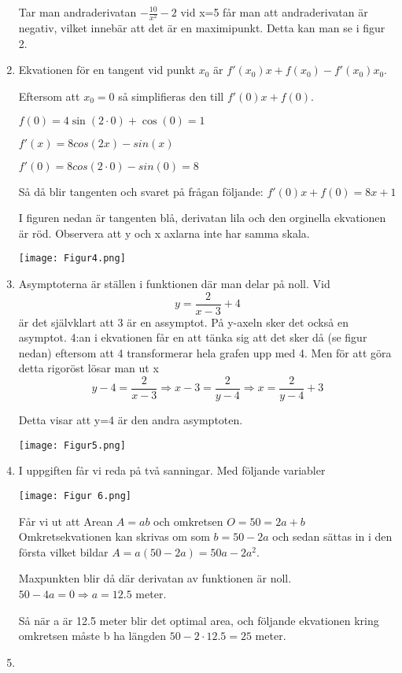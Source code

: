 \documentclass[a4paper,12pt]{article}
\begin{document}
\begin{enumerate}
    Tar man andraderivatan $-\frac{10}{x^2}-2$ vid x=5 får man att 
    andraderivatan är negativ, vilket innebär att det är en maximipunkt.   
    Detta kan man se i figur 2. 

    \item 
    Ekvationen för en tangent vid punkt $x_0$ är
    $f'(x_0)x+f(x_0)-f'(x_0)x_0$.
    
    Eftersom att $x_0=0$ så simplifieras den till
    $f'(0)x+f(0)$.

    $f(0)=4\sin(2\cdot 0)+\cos(0)=1$

    $f'(x)=8cos(2x)-sin(x)$
    
    $f'(0)=8cos(2\cdot 0)-sin(0)=8$

    Så då blir tangenten och svaret på frågan följande:
    $f'(0)x+f(0)=8x+1$

    I figuren nedan är tangenten blå, derivatan lila 
    och den orginella ekvationen är röd. Observera att 
    y och x axlarna inte har samma skala.

    \begin{center}    
        \texttt{[image: Figur4.png]}
    \end{center}

    \item Asymptoterna är ställen i funktionen där man delar på noll.
    Vid $$y=\frac{2}{x-3}+4$$ är det självklart att 3 är en assymptot.
    På y-axeln sker det också en asymptot. 4:an i ekvationen
    får en att tänka sig att det sker då (se figur nedan) eftersom
    att 4 transformerar hela grafen upp med 4. Men för att göra detta 
    rigoröst lösar man ut x
    $$y-4=\frac{2}{x-3}\Rightarrow x-3=\frac{2}{y-4}\Rightarrow x=\frac{2}{y-4}+3 $$

    Detta visar att y=4 är den andra asymptoten.
    
    \begin{center}
        \texttt{[image: Figur5.png]}
    \end{center}

    \item 
    I uppgiften får vi reda på två sanningar. Med följande variabler

    \begin{center}
        \texttt{[image: Figur 6.png]}
    \end{center}
    
    Får vi ut att Arean $A=ab$ och omkretsen $O=50=2a+b$
    Omkretsekvationen kan skrivas om som $b=50-2a$ och sedan 
    sättas in i den första vilket bildar $A=a(50-2a)=50a-2a^2$.

    Maxpunkten blir då där derivatan av funktionen är noll.
    $50-4a=0\Rightarrow a=12.5$ meter.

    Så när a är 12.5 meter blir det optimal area, och följande 
    ekvationen kring omkretsen måste b ha längden $50-2\cdot 12.5=25$ meter.

    \item 
    


\end{enumerate}
\end{document}
